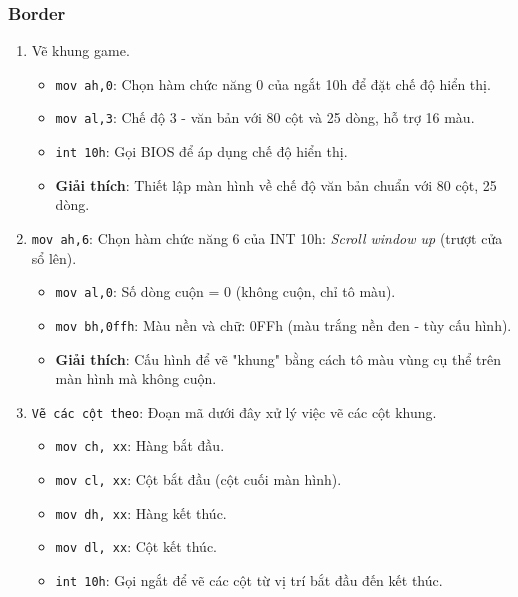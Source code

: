 \documentclass[12pt]{article}
\begin{document}
\subsubsection*{Border}
\begin{enumerate}[label=\textbf{\arabic*.}]
     \begin{figure}[H]
  \centering
  \texttt{[image: pics/border.png]}
\end{figure}
    \item \texttt{} Vẽ khung game.
    \begin{itemize}
        \item \texttt{mov ah,0}: Chọn hàm chức năng 0 của ngắt 10h để đặt chế độ hiển thị.
        \item \texttt{mov al,3}: Chế độ 3 - văn bản với 80 cột và 25 dòng, hỗ trợ 16 màu.
        \item \texttt{int 10h}: Gọi BIOS để áp dụng chế độ hiển thị.
        \item \textbf{Giải thích}: Thiết lập màn hình về chế độ văn bản chuẩn với 80 cột, 25 dòng.
    \end{itemize}

    \item \texttt{mov ah,6}: Chọn hàm chức năng 6 của INT 10h: \textit{Scroll window up} (trượt cửa sổ lên).
    \begin{itemize}
        \item \texttt{mov al,0}: Số dòng cuộn = 0 (không cuộn, chỉ tô màu).
        \item \texttt{mov bh,0ffh}: Màu nền và chữ: 0FFh (màu trắng nền đen - tùy cấu hình).
        \item \textbf{Giải thích}: Cấu hình để vẽ "khung" bằng cách tô màu vùng cụ thể trên màn hình mà không cuộn.
    \end{itemize}
    
    \item \texttt{Vẽ các cột theo}: Đoạn mã dưới đây xử lý việc vẽ các cột khung.
    \begin{itemize}
        \item \texttt{mov ch, xx}: Hàng bắt đầu.
        \item \texttt{mov cl, xx}: Cột bắt đầu (cột cuối màn hình).
        \item \texttt{mov dh, xx}: Hàng kết thúc.
        \item \texttt{mov dl, xx}: Cột kết thúc.
        \item \texttt{int 10h}: Gọi ngắt để vẽ các cột từ vị trí bắt đầu đến kết thúc.
    \end{itemize}

\end{enumerate}
\end{document}

